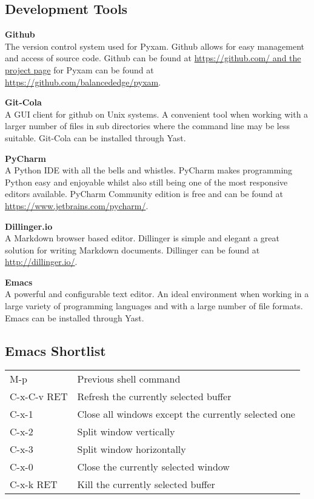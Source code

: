 \documentclass[9pt]{extarticle}
\begin{document}
\begin{multicols}{2}
\subsection*{Development Tools}
\begin{description}
    \item {\bf Github} \\
        The version control system used for Pyxam. Github allows for easy
        management and access of source code. Github can be found at
        \url{https://github.com/ and the project page} for Pyxam
        can be found at \url{https://github.com/balancededge/pyxam}.  
    \item {\bf Git-Cola} \\
        A GUI client for github on Unix systems. A convenient tool when
        working with a larger number of files in sub directories where the
        command line may be less suitable. Git-Cola can be installed through
        Yast.
    \item {\bf PyCharm} \\
        A Python IDE with all the bells and whistles. PyCharm makes
        programming Python easy and enjoyable whilst also still being one of the
        most responsive editors available. PyCharm Community edition is free
        and can be found at \url{https://www.jetbrains.com/pycharm/}.
    \item {\bf Dillinger.io} \\
        A Markdown browser based editor. Dillinger is simple and elegant a
        great solution for writing Markdown documents. Dillinger can be found
        at \url{http://dillinger.io/}.
    \item {\bf Emacs } \\
        A powerful and configurable text editor. An ideal environment when
        working in a large variety of programming languages and with a large
        number of file formats. Emacs can be installed through Yast.
\end{description}
\subsection*{Emacs Shortlist}
\begin{tabular}{l l}
M-p & Previous shell command \\
C-x-C-v RET & Refresh the currently selected buffer \\
C-x-1 & Close all windows except the currently selected one \\
C-x-2 & Split window vertically \\
C-x-3 & Split window horizontally \\
C-x-0 & Close the currently selected window \\
C-x-k RET & Kill the currently selected buffer \\
\end{tabular}

\end{multicols}
\end{document}
